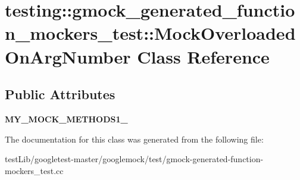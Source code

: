 \hypertarget{classtesting_1_1gmock__generated__function__mockers__test_1_1MockOverloadedOnArgNumber}{}\section{testing\+:\+:gmock\+\_\+generated\+\_\+function\+\_\+mockers\+\_\+test\+:\+:Mock\+Overloaded\+On\+Arg\+Number Class Reference}
\label{classtesting_1_1gmock__generated__function__mockers__test_1_1MockOverloadedOnArgNumber}
\subsection*{Public Attributes}
\begin{DoxyCompactItemize}
\item 
\mbox{\label{classtesting_1_1gmock__generated__function__mockers__test_1_1MockOverloadedOnArgNumber_a5076ebd17fb1cc93952b4a80fe6de894}} 
{\bfseries M\+Y\+\_\+\+M\+O\+C\+K\+\_\+\+M\+E\+T\+H\+O\+D\+S1\+\_\+}
\end{DoxyCompactItemize}


The documentation for this class was generated from the following file\+:\begin{DoxyCompactItemize}
\item 
test\+Lib/googletest-\/master/googlemock/test/gmock-\/generated-\/function-\/mockers\+\_\+test.\+cc\end{DoxyCompactItemize}
